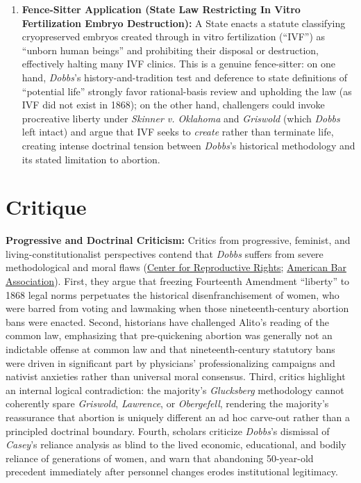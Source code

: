 \documentclass[12pt]{article}
\begin{document}
\begin{enumerate}
  \item \textbf{Fence-Sitter Application (State Law Restricting In Vitro Fertilization Embryo Destruction):} A State enacts a statute classifying cryopreserved embryos created through in vitro fertilization (``IVF'') as ``unborn human beings'' and prohibiting their disposal or destruction, effectively halting many IVF clinics. This is a genuine fence-sitter: on one hand, \textit{Dobbs}'s history-and-tradition test and deference to state definitions of ``potential life'' strongly favor rational-basis review and upholding the law (as IVF did not exist in 1868); on the other hand, challengers could invoke procreative liberty under \textit{Skinner v. Oklahoma} and \textit{Griswold} (which \textit{Dobbs} left intact) and argue that IVF seeks to \textit{create} rather than terminate life, creating intense doctrinal tension between \textit{Dobbs}'s historical methodology and its stated limitation to abortion.
\end{enumerate}

\section{Critique}

\textbf{Progressive and Doctrinal Criticism:} Critics from progressive, feminist, and living-constitutionalist perspectives contend that \textit{Dobbs} suffers from severe methodological and moral flaws (\href{https://reproductiverights.org/wp-content/uploads/2023/03/Legal-Analysis-What-Dobbs-Got-Wrong-3.15.23.pdf}{Center for Reproductive Rights}; \href{https://www.americanbar.org/groups/communications_law/resources/magazine/2023-summer/how-supreme-courts-decision-dobbs-threatens-privacy-free-speech-rights/}{American Bar Association}). First, they argue that freezing Fourteenth Amendment ``liberty'' to 1868 legal norms perpetuates the historical disenfranchisement of women, who were barred from voting and lawmaking when those nineteenth-century abortion bans were enacted. Second, historians have challenged Alito's reading of the common law, emphasizing that pre-quickening abortion was generally not an indictable offense at common law and that nineteenth-century statutory bans were driven in significant part by physicians' professionalizing campaigns and nativist anxieties rather than universal moral consensus. Third, critics highlight an internal logical contradiction: the majority's \textit{Glucksberg} methodology cannot coherently spare \textit{Griswold}, \textit{Lawrence}, or \textit{Obergefell}, rendering the majority's reassurance that abortion is uniquely different an ad hoc carve-out rather than a principled doctrinal boundary. Fourth, scholars criticize \textit{Dobbs}'s dismissal of \textit{Casey}'s reliance analysis as blind to the lived economic, educational, and bodily reliance of generations of women, and warn that abandoning 50-year-old precedent immediately after personnel changes erodes institutional legitimacy.
\end{document}
